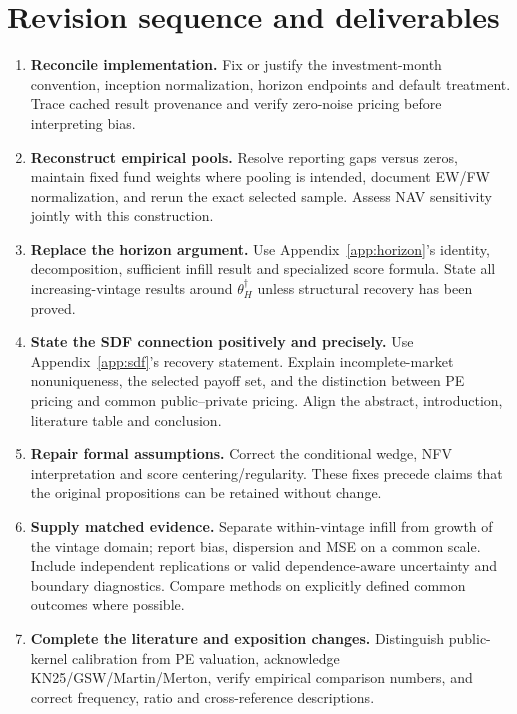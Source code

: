 \documentclass[11pt]{article}
\theoremstyle{plain}
\theoremstyle{definition}
\begin{document}
\section{Revision sequence and deliverables}
\label{sec:revision}

\begin{enumerate}
\item \textbf{Reconcile implementation.} Fix or justify the investment-month convention, inception normalization, horizon endpoints and default treatment. Trace cached result provenance and verify zero-noise pricing before interpreting bias.
\item \textbf{Reconstruct empirical pools.} Resolve reporting gaps versus zeros, maintain fixed fund weights where pooling is intended, document EW/FW normalization, and rerun the exact selected sample. Assess NAV sensitivity jointly with this construction.
\item \textbf{Replace the horizon argument.} Use Appendix~\ref{app:horizon}'s identity, decomposition, sufficient infill result and specialized score formula. State all increasing-vintage results around $\theta_H^\dagger$ unless structural recovery has been proved.
\item \textbf{State the SDF connection positively and precisely.} Use Appendix~\ref{app:sdf}'s recovery statement. Explain incomplete-market nonuniqueness, the selected payoff set, and the distinction between PE pricing and common public--private pricing. Align the abstract, introduction, literature table and conclusion.
\item \textbf{Repair formal assumptions.} Correct the conditional wedge, NFV interpretation and score centering/regularity. These fixes precede claims that the original propositions can be retained without change.
\item \textbf{Supply matched evidence.} Separate within-vintage infill from growth of the vintage domain; report bias, dispersion and MSE on a common scale. Include independent replications or valid dependence-aware uncertainty and boundary diagnostics. Compare methods on explicitly defined common outcomes where possible.
\item \textbf{Complete the literature and exposition changes.} Distinguish public-kernel calibration from PE valuation, acknowledge KN25/GSW/Martin/Merton, verify empirical comparison numbers, and correct frequency, ratio and cross-reference descriptions.
\end{enumerate}
\end{document}
